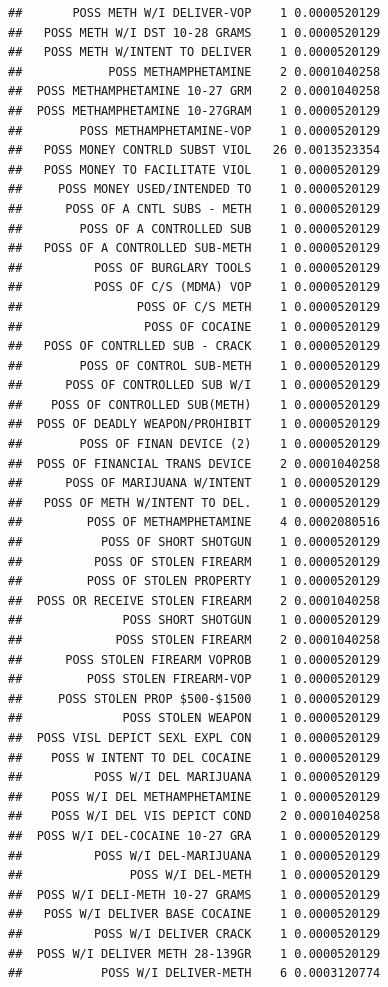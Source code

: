 \documentclass[]{book}
\begin{document}
\begin{verbatim}
##       POSS METH W/I DELIVER-VOP    1 0.0000520129
##   POSS METH W/I DST 10-28 GRAMS    1 0.0000520129
##   POSS METH W/INTENT TO DELIVER    1 0.0000520129
##            POSS METHAMPHETAMINE    2 0.0001040258
##  POSS METHAMPHETAMINE 10-27 GRM    2 0.0001040258
##  POSS METHAMPHETAMINE 10-27GRAM    1 0.0000520129
##        POSS METHAMPHETAMINE-VOP    1 0.0000520129
##   POSS MONEY CONTRLD SUBST VIOL   26 0.0013523354
##   POSS MONEY TO FACILITATE VIOL    1 0.0000520129
##     POSS MONEY USED/INTENDED TO    1 0.0000520129
##      POSS OF A CNTL SUBS - METH    1 0.0000520129
##        POSS OF A CONTROLLED SUB    1 0.0000520129
##   POSS OF A CONTROLLED SUB-METH    1 0.0000520129
##          POSS OF BURGLARY TOOLS    1 0.0000520129
##          POSS OF C/S (MDMA) VOP    1 0.0000520129
##                POSS OF C/S METH    1 0.0000520129
##                 POSS OF COCAINE    1 0.0000520129
##   POSS OF CONTRLLED SUB - CRACK    1 0.0000520129
##        POSS OF CONTROL SUB-METH    1 0.0000520129
##      POSS OF CONTROLLED SUB W/I    1 0.0000520129
##    POSS OF CONTROLLED SUB(METH)    1 0.0000520129
##  POSS OF DEADLY WEAPON/PROHIBIT    1 0.0000520129
##        POSS OF FINAN DEVICE (2)    1 0.0000520129
##  POSS OF FINANCIAL TRANS DEVICE    2 0.0001040258
##      POSS OF MARIJUANA W/INTENT    1 0.0000520129
##   POSS OF METH W/INTENT TO DEL.    1 0.0000520129
##         POSS OF METHAMPHETAMINE    4 0.0002080516
##           POSS OF SHORT SHOTGUN    1 0.0000520129
##          POSS OF STOLEN FIREARM    1 0.0000520129
##         POSS OF STOLEN PROPERTY    1 0.0000520129
##  POSS OR RECEIVE STOLEN FIREARM    2 0.0001040258
##              POSS SHORT SHOTGUN    1 0.0000520129
##             POSS STOLEN FIREARM    2 0.0001040258
##      POSS STOLEN FIREARM VOPROB    1 0.0000520129
##         POSS STOLEN FIREARM-VOP    1 0.0000520129
##     POSS STOLEN PROP $500-$1500    1 0.0000520129
##              POSS STOLEN WEAPON    1 0.0000520129
##  POSS VISL DEPICT SEXL EXPL CON    1 0.0000520129
##    POSS W INTENT TO DEL COCAINE    1 0.0000520129
##          POSS W/I DEL MARIJUANA    1 0.0000520129
##    POSS W/I DEL METHAMPHETAMINE    1 0.0000520129
##    POSS W/I DEL VIS DEPICT COND    2 0.0001040258
##  POSS W/I DEL-COCAINE 10-27 GRA    1 0.0000520129
##          POSS W/I DEL-MARIJUANA    1 0.0000520129
##               POSS W/I DEL-METH    1 0.0000520129
##  POSS W/I DELI-METH 10-27 GRAMS    1 0.0000520129
##   POSS W/I DELIVER BASE COCAINE    1 0.0000520129
##          POSS W/I DELIVER CRACK    1 0.0000520129
##  POSS W/I DELIVER METH 28-139GR    1 0.0000520129
##           POSS W/I DELIVER-METH    6 0.0003120774

\end{verbatim}
\end{document}
